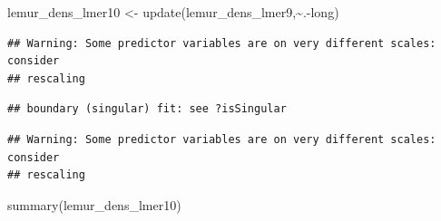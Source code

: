 \documentclass[
  12pt,
]{article}
\newenvironment{Shaded}{\begin{snugshade}}{\end{snugshade}}
\newcommand{\FunctionTok}[1]{\textcolor[rgb]{0.00,0.00,0.00}{#1}}
\newcommand{\NormalTok}[1]{#1}
\newcommand{\OtherTok}[1]{\textcolor[rgb]{0.56,0.35,0.01}{#1}}
\newcommand{\SpecialCharTok}[1]{\textcolor[rgb]{0.00,0.00,0.00}{#1}}
\begin{document}
\begin{Shaded}
\begin{Highlighting}[]
\NormalTok{lemur\_dens\_lmer10 }\OtherTok{\textless{}{-}} \FunctionTok{update}\NormalTok{(lemur\_dens\_lmer9,}\SpecialCharTok{\textasciitilde{}}\NormalTok{.}\SpecialCharTok{{-}}\NormalTok{long)}
\end{Highlighting}
\end{Shaded}

\begin{verbatim}
## Warning: Some predictor variables are on very different scales: consider
## rescaling
\end{verbatim}

\begin{verbatim}
## boundary (singular) fit: see ?isSingular
\end{verbatim}

\begin{verbatim}
## Warning: Some predictor variables are on very different scales: consider
## rescaling
\end{verbatim}

\begin{Shaded}
\begin{Highlighting}[]
\FunctionTok{summary}\NormalTok{(lemur\_dens\_lmer10)}
\end{Highlighting}
\end{Shaded}
\end{document}
